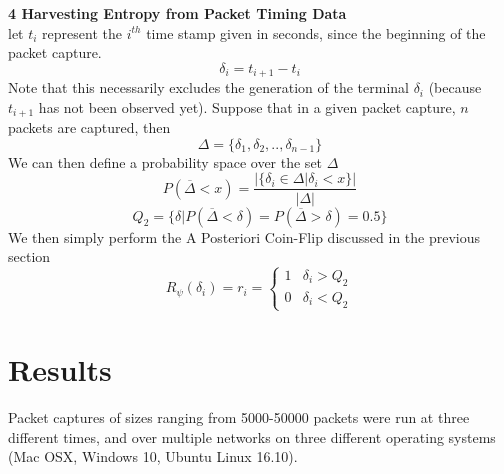 \documentclass{IEEEtran}
\newenvironment{definition}[1][Definition]{\begin{trivlist}
\item[\hskip \labelsep {\bfseries #1}]}{\end{trivlist}}
\begin{document}
\begin{definition}
\textbf{4 Harvesting Entropy from Packet Timing Data} \\
let $t_i$ represent the $i^{th}$ time stamp given in seconds, since the beginning of the packet capture. 
$$\delta_i = t_{i+1} - t_{i}$$
Note that this necessarily excludes the generation of the terminal $\delta_i$ (because $t_{i+1}$ has not been observed yet). Suppose that in a given packet capture, $n$ packets are captured, then
$$\Delta = \{\delta_1,\delta_2,..,\delta_{n-1}\}$$
We can then define a probability space over the set $\Delta$
$$P(\overline{\Delta} < x) =  \frac{\vert\{\delta_i \in \Delta| \delta_i < x\}\vert}{\vert \Delta \vert}$$
$$Q_2 = \{\delta \vert P(\overline{\Delta} < \delta) = P(\overline{\Delta} > \delta) = 0.5\}$$
We then simply perform the A Posteriori Coin-Flip discussed in the previous section
$$R_\psi(\delta_i) =  r_i = \begin{cases} 
      1 & \delta_i > Q_2 \\
      0 & \delta_i < Q_2
   \end{cases}$$

\end{definition}

\section{Results} 

Packet captures of sizes ranging from 5000-50000 packets were run at three different times, and over multiple networks on three different operating systems (Mac OSX, Windows 10, Ubuntu Linux 16.10). 
\end{document}
